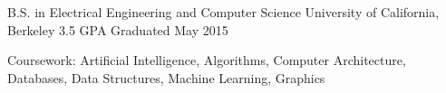 \begin{cventries}
  \cventry
    {B.S. in Electrical Engineering and Computer Science}
    {University of California, Berkeley}
    {3.5 GPA}
    {Graduated May 2015}
    {
      \begin{cvitems}
        \item {Coursework: Artificial Intelligence, Algorithms, Computer Architecture, Databases, Data Structures, Machine Learning, Graphics}
      \end{cvitems}
    }
\end{cventries}
